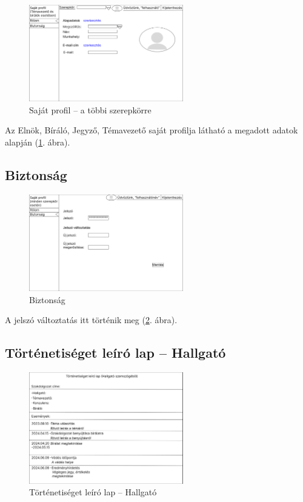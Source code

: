 \documentclass[a4paper,12pt]{article}
\begin{document}
\begin{figure}[h!]
	\centering
	\includegraphics[width=0.6\textwidth]{images/Web_pages/My_Profile.jpg}
	\caption{Saját profil -- a többi szerepkörre}
	\label{fig:My_Profile}
\end{figure}

Az Elnök, Bíráló, Jegyző, Témavezető saját profilja látható a megadott adatok alapján (\ref{fig:My_Profile}. ábra).    

\subsection{Biztonság}

\begin{figure}[h!]
	\centering
	\includegraphics[width=0.6\textwidth]{images/Web_pages/Security.jpg}
	\caption{Biztonság}
	\label{fig:Security}
\end{figure}

A jelszó változtatás itt történik meg (\ref{fig:Security}. ábra).

\subsection{Történetiséget leíró lap -- Hallgató}

\begin{figure}[h!]
	\centering
	\includegraphics[width=0.6\textwidth]{images/Web_pages/History_Student.jpg}
	\caption{Történetiséget leíró lap -- Hallgató}
	\label{fig:History_Student}
\end{figure}
\end{document}
